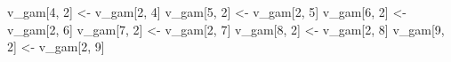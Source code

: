 \documentclass[
  letterpaper,
  DIV=11,
  numbers=noendperiod]{scrartcl}
\newenvironment{Shaded}{\begin{snugshade}}{\end{snugshade}}
\newcommand{\DecValTok}[1]{\textcolor[rgb]{0.68,0.00,0.00}{#1}}
\newcommand{\NormalTok}[1]{\textcolor[rgb]{0.00,0.23,0.31}{#1}}
\newcommand{\OtherTok}[1]{\textcolor[rgb]{0.00,0.23,0.31}{#1}}
\begin{document}
\begin{Shaded}
\begin{Highlighting}[]
\NormalTok{  v\_gam[}\DecValTok{4}\NormalTok{, }\DecValTok{2}\NormalTok{] }\OtherTok{\textless{}{-}}\NormalTok{ v\_gam[}\DecValTok{2}\NormalTok{, }\DecValTok{4}\NormalTok{]}
\NormalTok{  v\_gam[}\DecValTok{5}\NormalTok{, }\DecValTok{2}\NormalTok{] }\OtherTok{\textless{}{-}}\NormalTok{ v\_gam[}\DecValTok{2}\NormalTok{, }\DecValTok{5}\NormalTok{]}
\NormalTok{  v\_gam[}\DecValTok{6}\NormalTok{, }\DecValTok{2}\NormalTok{] }\OtherTok{\textless{}{-}}\NormalTok{ v\_gam[}\DecValTok{2}\NormalTok{, }\DecValTok{6}\NormalTok{]}
\NormalTok{  v\_gam[}\DecValTok{7}\NormalTok{, }\DecValTok{2}\NormalTok{] }\OtherTok{\textless{}{-}}\NormalTok{ v\_gam[}\DecValTok{2}\NormalTok{, }\DecValTok{7}\NormalTok{]}
\NormalTok{  v\_gam[}\DecValTok{8}\NormalTok{, }\DecValTok{2}\NormalTok{] }\OtherTok{\textless{}{-}}\NormalTok{ v\_gam[}\DecValTok{2}\NormalTok{, }\DecValTok{8}\NormalTok{]}
\NormalTok{  v\_gam[}\DecValTok{9}\NormalTok{, }\DecValTok{2}\NormalTok{] }\OtherTok{\textless{}{-}}\NormalTok{ v\_gam[}\DecValTok{2}\NormalTok{, }\DecValTok{9}\NormalTok{]}


\end{Highlighting}
\end{Shaded}
\end{document}
